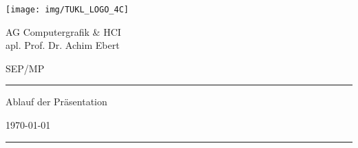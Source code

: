 \thispagestyle{empty}
	\newcommand{\Rule}{\rule{\textwidth}{0.5mm}}
	\begin{center}
	{\Large \texttt{[image: img/TUKL\_LOGO\_4C]} \par}

	\vspace{0.5em}

	{\Large AG Computergrafik \& HCI \\ apl. Prof. Dr. Achim Ebert \par}

	\vspace{0.5em}

	{\Large SEP/MP \the\year \par}


	\vspace{5cm}

	\Rule

	\vspace{1cm}

	{\Huge Ablauf der Präsentation \par}

	\vspace{0.5em}

	{\Large \mysubject \par}

	\vspace{0.5em}

	{\small \today \par}

	\vspace{0.7cm}

	\Rule


	\vfill %


	\emph{\textbf{\mygroup}} \\[1em]
	\myauthor

	\end{center}
